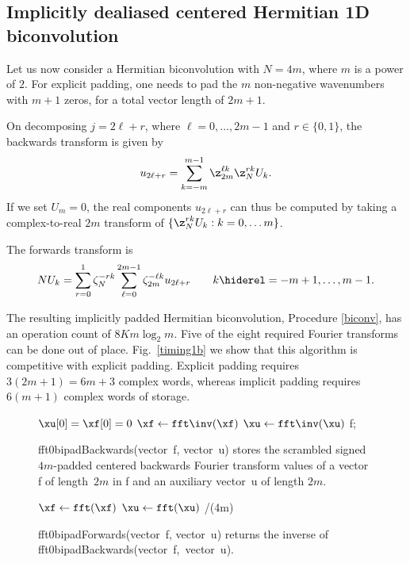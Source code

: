 \documentclass[final]{siamltex}
\def\be{\begin{dmath*}}
\def\ee{\end{dmath*}}
\def\bec{\begin{dmath*}[compact]}
\let\eec\ee
\def\no{\hiderel}
\begin{document}
\subsection{Implicitly dealiased centered Hermitian 1D biconvolution}
Let us now consider a Hermitian biconvolution with $N=4m$, where $m$ is a
power of $2$. For explicit padding, one needs to pad the $m$ non-negative
wavenumbers with $m+1$ zeros, for a total vector length of $2m+1$.

On decomposing $j=2\ell+r$, where
$\ell=0,\ldots, 2m-1$ and $r\in\{0,1\}$, the backwards transform is given
by
\bec
u_{2\ell +r}=\sum_{k=-m}^{m-1} \z_{2m}^{\ell k} \z_N^{rk} U_k.
\eec
If we set $U_m=0$, the real components $u_{2\ell +r}$ can thus be computed
by taking a complex-to-real $2m$ transform of
$\{\z_N^{rk} U_k : k=0,\ldots m\}$.

The forwards transform is
\be
NU_k=\sum_{r=0}^{1}\zeta_N^{-rk}
\sum_{\ell=0}^{2m-1} \zeta_{2m}^{-\ell k} u_{2\ell+r}
\qquad k\no =-m+1,\ldots,m-1.
\ee

The resulting implicitly padded Hermitian biconvolution,
Procedure \ref{biconv}, has an operation count of $8Km\log_2 m$. 
Five of the eight required Fourier transforms can be done out of place.
Fig.~\ref{timing1b} we show that this algorithm is competitive with
explicit padding. Explicit padding requires $3(2m+1)=6m+3$ complex words,
whereas implicit padding requires $6(m+1)$ complex words of storage.

\begin{figure}[htbp]
\begin{minipage}{0.51\linewidth}
\begin{procedure}[H]
  $\xu[0]=\xf[0]=0$\;
  $\xf \leftarrow \fft\inv(\xf)$\;
  $\xu \leftarrow \fft\inv(\xu)$\;
  \Return f;
  \caption{fft0bipadBackwards(vector~{\sf f}, vector~{\sf u}) stores the 
scrambled signed~$4m$-padded centered backwards Fourier transform values of a
vector {\sf f} of length~$2m$ in {\sf f} and an auxiliary vector~{\sf u} of
length $2m$.}\label{fft0bipadBackwards}
\end{procedure}
\end{minipage}
%
\begin{minipage}{0.49\linewidth}
\begin{function}[H]
  $\xf \leftarrow \fft(\xf)$\;
  $\xu \leftarrow \fft(\xu)$\;
  \Return \xf/(4m)\;
  \caption{fft0bipadForwards(vector~{\sf f}, vector~{\sf u}) returns the
inverse of fft0bipadBackwards(\hbox{vector~{\sf f}, vector~{\sf u}}).}
\label{fft0bipadForwards}
\end{function}
\end{minipage}
\end{figure}
\end{document}
